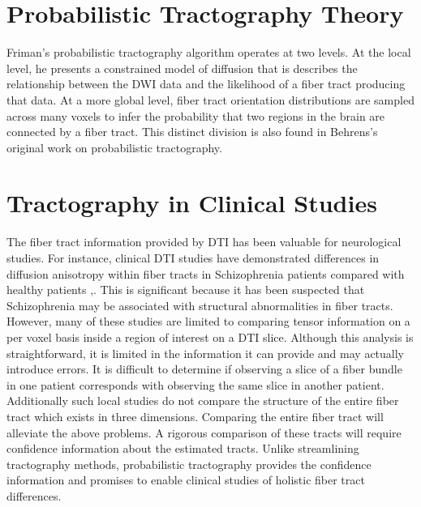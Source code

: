 \section{Probabilistic Tractography Theory}

Friman's probabilistic tractography algorithm \cite{frimanTMI06} operates at two levels.  At the local level, he presents a constrained model of diffusion that is describes the relationship between the DWI data and the likelihood of a fiber tract producing that data.  At a more global level, fiber tract orientation distributions are sampled across many voxels to infer the probability that two regions in the brain are connected by a fiber tract.  This distinct division is also found in Behrens's original work \cite{behrensMRM03} on probabilistic tractography.

\section{Tractography in Clinical Studies}
The fiber tract information provided by DTI has been valuable for neurological studies.  For instance, clinical DTI studies have demonstrated differences in diffusion anisotropy within fiber tracts in Schizophrenia patients compared with healthy patients \cite{kubickiBiologPsych03},\cite{kubickiNI05}.  This is significant because it has been suspected that Schizophrenia may be associated with structural abnormalities in fiber tracts.  However, many of these studies are limited to comparing tensor information on a per voxel basis inside a region of interest on a DTI slice.  Although this analysis is straightforward, it is limited in the information it can provide and may actually introduce errors.  It is difficult to determine if observing a slice of a fiber bundle in one patient corresponds with observing the same slice in another patient.  Additionally such local studies do not compare the structure of the entire fiber tract which exists in three dimensions.  Comparing the entire fiber tract will alleviate the above problems.  A rigorous comparison of these tracts will require confidence information about the estimated tracts.  Unlike streamlining tractography methods, probabilistic tractography provides the confidence information and promises to enable clinical studies of holistic fiber tract differences.

